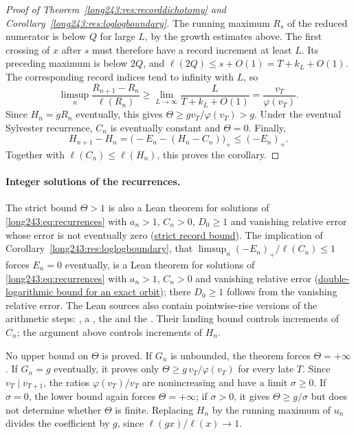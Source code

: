 \documentclass[11pt]{article}
\newcommand{\latecommit}{168bf6727758f918a430ef056a1c93d3160b53a6}
\newcommand{\laterepobase}{https://github.com/wcook04/plectis-erdos/blob/\latecommit}
\begin{document}
\begin{proof}[Proof of Theorem~\ref{long243:res:recorddichotomy} and
Corollary~\ref{long243:res:loglogboundary}]
The running maximum $R_s$ of the reduced numerator is below $Q$ for
large $L$, by the growth estimates above. The first crossing of $x$
after $s$ must therefore have a record increment at least $L$.
Its preceding maximum is below $2Q$, and
$\ell(2Q)\le s+O(1)=T+k_L+O(1)$. The corresponding record indices tend
to infinity with $L$, so
\[
 \limsup_n\frac{R_{n+1}-R_n}{\ell(R_n)}
 \ge\lim_{L\to\infty}\frac{L}{T+k_L+O(1)}
 =\frac{v_T}{\varphi(v_T)}.
\]
Since $H_n=gR_n$ eventually, this gives
$\Theta\ge g v_T/\varphi(v_T)>g$.
Under the eventual Sylvester recurrence, $C_n$ is eventually constant and $\Theta=0$.
Finally,
\[
 H_{n+1}-H_n=\bigl(-E_n-(H_n-C_n)\bigr)_+\le(-E_n)_+.
\]
Together with $\ell(C_n)\le\ell(H_n)$, this proves the corollary.
\end{proof}

\paragraph{Integer solutions of the recurrences.}
The strict bound $\Theta>1$ is also a Lean theorem for solutions of
\eqref{long243:eq:recurrences} with $a_n>1$, $C_n>0$, $D_0\ge1$ and vanishing relative error whose error
is not eventually zero
(\href{\laterepobase/lean/ErdosProblems/Erdos243/PaperCompleteR21/ExactOrbitRecordDichotomy.lean\#L363}{strict record bound}).
The implication of Corollary~\ref{long243:res:loglogboundary}, that
$\limsup_n(-E_n)_+/\ell(C_n)\le1$ forces $E_n=0$ eventually, is a Lean
theorem for solutions of \eqref{long243:eq:recurrences} with $a_n>1$,
$C_n>0$ and vanishing relative error
(\href{\laterepobase/lean/ErdosProblems/Erdos243/PaperCompleteR21/DoubleLogOrbitBound.lean\#L45}{double-logarithmic bound for an exact orbit});
there $D_0\ge1$ follows from the vanishing relative error.
The Lean sources also contain pointwise-rise versions of the arithmetic
steps:
, a
\lword{Erdos243/SlowRiseBarrier.lean}{51}{exists_consecutiveMultiples_between}{CRT
block starting in $[P,2P)$}, the
 and the
. Their landing bound controls increments of $C_n$; the
argument above controls increments of $H_n$.

No upper bound on $\Theta$ is proved. If $G_n$ is unbounded, the theorem
forces $\Theta=+\infty$. If $G_n=g$ eventually, it proves only
$\Theta\ge g\,v_T/\varphi(v_T)$ for every late $T$. Since $v_T\mid v_{T+1}$,
the ratios $\varphi(v_T)/v_T$ are nonincreasing and have a limit
$\sigma\ge0$. If $\sigma=0$, the lower bound again forces
$\Theta=+\infty$; if $\sigma>0$, it gives $\Theta\ge g/\sigma$ but does
not determine whether $\Theta$ is finite. Replacing $H_n$ by the running
maximum of $u_n$ divides the coefficient by $g$, since
$\ell(gx)/\ell(x)\to1$.
\end{document}
